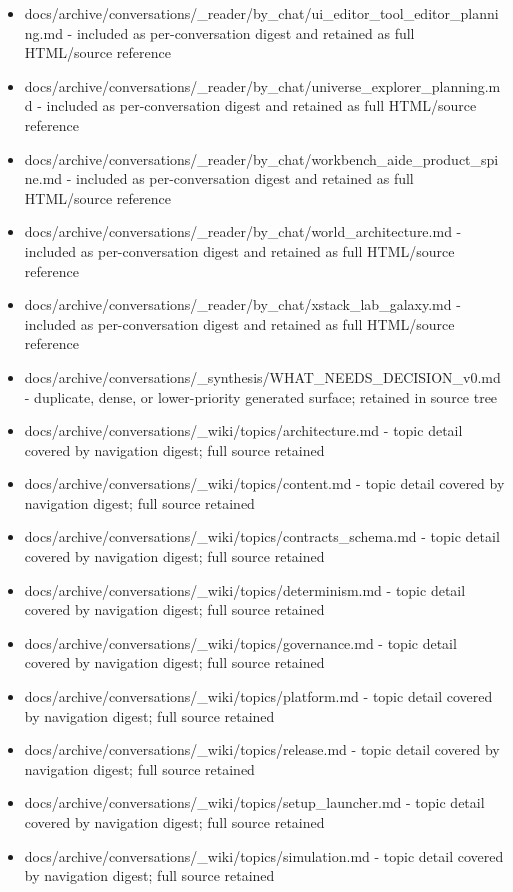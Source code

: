 \documentclass[11pt,a4paper]{report}
\begin{document}
\begin{itemize}
\item docs/archive/conversations/\_reader/by\_chat/ui\_editor\_tool\_editor\_planning.md - included as per-conversation digest and retained as full HTML/source reference
\item docs/archive/conversations/\_reader/by\_chat/universe\_explorer\_planning.md - included as per-conversation digest and retained as full HTML/source reference
\item docs/archive/conversations/\_reader/by\_chat/workbench\_aide\_product\_spine.md - included as per-conversation digest and retained as full HTML/source reference
\item docs/archive/conversations/\_reader/by\_chat/world\_architecture.md - included as per-conversation digest and retained as full HTML/source reference
\item docs/archive/conversations/\_reader/by\_chat/xstack\_lab\_galaxy.md - included as per-conversation digest and retained as full HTML/source reference
\item docs/archive/conversations/\_synthesis/WHAT\_NEEDS\_DECISION\_v0.md - duplicate, dense, or lower-priority generated surface; retained in source tree
\item docs/archive/conversations/\_wiki/topics/architecture.md - topic detail covered by navigation digest; full source retained
\item docs/archive/conversations/\_wiki/topics/content.md - topic detail covered by navigation digest; full source retained
\item docs/archive/conversations/\_wiki/topics/contracts\_schema.md - topic detail covered by navigation digest; full source retained
\item docs/archive/conversations/\_wiki/topics/determinism.md - topic detail covered by navigation digest; full source retained
\item docs/archive/conversations/\_wiki/topics/governance.md - topic detail covered by navigation digest; full source retained
\item docs/archive/conversations/\_wiki/topics/platform.md - topic detail covered by navigation digest; full source retained
\item docs/archive/conversations/\_wiki/topics/release.md - topic detail covered by navigation digest; full source retained
\item docs/archive/conversations/\_wiki/topics/setup\_launcher.md - topic detail covered by navigation digest; full source retained
\item docs/archive/conversations/\_wiki/topics/simulation.md - topic detail covered by navigation digest; full source retained

\end{itemize}
\end{document}
